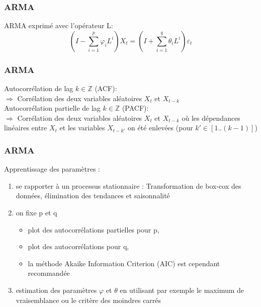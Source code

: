 \documentclass{formation}
\begin{document}
\begin{frame}
  \frametitle{ARMA}
  ARMA exprimé avec l'opérateur L: \\
  \[
  \left(I-\sum _{i=1}^{p}\varphi _{i}L^{i}\right)X_{t}=\left(I+\sum _{i=1}^{q}\theta _{i}L^{i}\right)\varepsilon _{t}
  \]
\end{frame}

\begin{frame}
  \frametitle{ARMA}
  Autocorrélation de lag $k\in\mathbb{Z}$ (ACF): \\
  $\Rightarrow$ Corrélation des deux variables aléatoires $X_t$ et $X_{t-k}$ \\
  \newline
  Autocorrélation partielle de lag $k\in\mathbb{Z}$ (PACF): \\
  $\Rightarrow$ Corrélation des deux variables aléatoires $X_t$ et $X_{t-k}$ où les dépendances linéaires entre $X_t$ et les variables $X_{t-k'}$ on été enlevées (pour $k'\in[1 .. (k-1)]$)  
\end{frame}

\begin{frame}
  \frametitle{ARMA}
  Apprentissage des paramètres : \\
  \begin{enumerate}
    \item se rapporter à un processus stationnaire : Transformation de box-cox des données, élimination des tendances et saisonnalité
    \item on fixe p et q
      \begin{itemize}
      \item plot des autocorrélations partielles pour p,
      \item plot des autocorrélations  pour q,
      \item la méthode Akaike Information Criterion (AIC) est cependant recommandée
      \end{itemize}
    \item estimation des paramètres $\varphi$ et $\theta$ en utilisant par exemple le maximum de vraisemblance ou le critère des moindres carrés
  \end{enumerate}
\end{frame}
\end{document}

